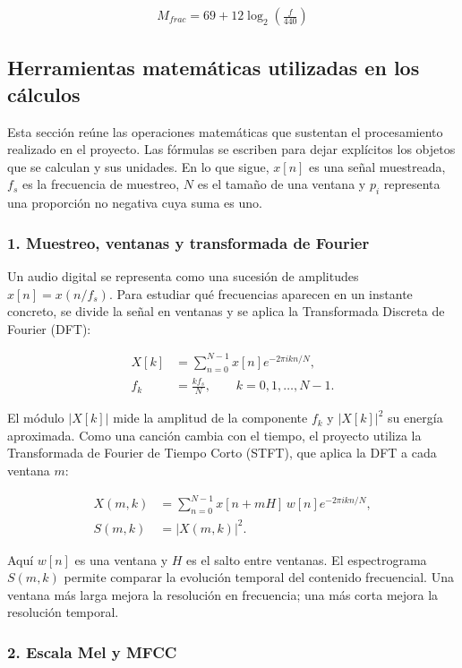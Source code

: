 \documentclass[11pt, a4paper]{article}
\begin{document}
\begin{align}
M_{frac} = 69 + 12 \log_2 \left( \frac{f}{440} \right)
\end{align}

\subsection*{Herramientas matemáticas utilizadas en los cálculos}

Esta sección reúne las operaciones matemáticas que sustentan el procesamiento realizado en el proyecto. Las fórmulas se escriben para dejar explícitos los objetos que se calculan y sus unidades. En lo que sigue, $x[n]$ es una señal muestreada, $f_s$ es la frecuencia de muestreo, $N$ es el tamaño de una ventana y $p_i$ representa una proporción no negativa cuya suma es uno.

\subsubsection*{1. Muestreo, ventanas y transformada de Fourier}

Un audio digital se representa como una sucesión de amplitudes $x[n]=x(n/f_s)$. Para estudiar qué frecuencias aparecen en un instante concreto, se divide la señal en ventanas y se aplica la Transformada Discreta de Fourier (DFT):

\begin{align}
X[k] &= \sum_{n=0}^{N-1} x[n]e^{-2\pi i kn/N}, \\
f_k &= \frac{k f_s}{N}, \qquad k=0,1,\ldots,N-1.
\end{align}

El módulo $|X[k]|$ mide la amplitud de la componente $f_k$ y $|X[k]|^2$ su energía aproximada. Como una canción cambia con el tiempo, el proyecto utiliza la Transformada de Fourier de Tiempo Corto (STFT), que aplica la DFT a cada ventana $m$:

\begin{align}
X(m,k) &= \sum_{n=0}^{N-1}x[n+mH]\,w[n]e^{-2\pi i kn/N}, \\
S(m,k) &= |X(m,k)|^2.
\end{align}

Aquí $w[n]$ es una ventana y $H$ es el salto entre ventanas. El espectrograma $S(m,k)$ permite comparar la evolución temporal del contenido frecuencial. Una ventana más larga mejora la resolución en frecuencia; una más corta mejora la resolución temporal.

\subsubsection*{2. Escala Mel y MFCC}
\end{document}
